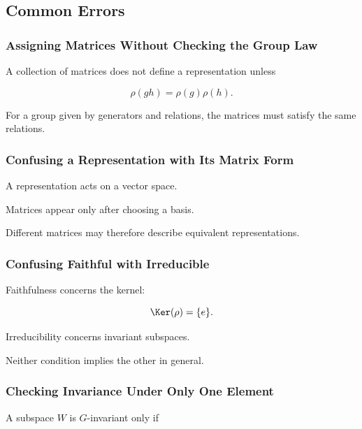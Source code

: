 \subsection{Common Errors}
\label{subsec:representation-common-errors}

\subsubsection{Assigning Matrices Without Checking the Group Law}

A collection of matrices does not define a representation unless

\[ \rho(gh)=\rho(g)\rho(h). \]

For a group given by generators and relations, the matrices must satisfy the
same relations.

\subsubsection{Confusing a Representation with Its Matrix Form}

A representation acts on a vector space.

Matrices appear only after choosing a basis.

Different matrices may therefore describe equivalent representations.

\subsubsection{Confusing Faithful with Irreducible}

Faithfulness concerns the kernel:

\[ \Ker(\rho)=\{e\}. \]

Irreducibility concerns invariant subspaces.

Neither condition implies the other in general.

\subsubsection{Checking Invariance Under Only One Element}

A subspace \(W\) is \(G\)-invariant only if

